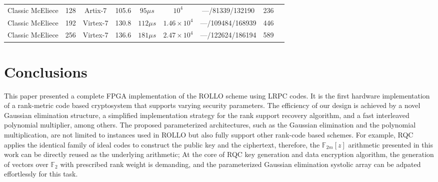 \documentclass[submission]{iacrtrans}
\theoremstyle{plain}
\begin{document}
\begin{table}[t]
\begin{minipage}{1\textwidth}
{\begin{tabular}{lcccccccc}
Classic McEliece\cite{bernstein2020classic} &{128} &{Artix-7} & {105.6}   & $95 \mu s$    & $10^4$  & {---/81339/132190}& {236}\\
Classic McEliece\cite{bernstein2020classic} &{192} &{Virtex-7} & {130.8}   & $112 \mu s$    & $1.46\times 10^4$  & {---/109484/168939}& {446}\\
Classic McEliece\cite{bernstein2020classic} &{256} &{Virtex-7} & {136.6}   & $181 \mu s$    & $2.47\times 10^4$  & {---/122624/186194}& {589}\\
\hline
\end{tabular}}
\end{minipage}
\end{table}

\section{Conclusions}
This paper presented a complete FPGA implementation of the ROLLO scheme using LRPC codes.
It is the first hardware implementation of a rank-metric code based cryptosystem that supports varying security parameters. The efficiency of our design is achieved by a novel Gaussian elimination structure, a simplified implementation strategy for the rank support recovery algorithm, and a fast interleaved polynomial multiplier, among others. The proposed parameterized architectures, such as the Gaussian elimination and the polynomial multiplication, are not limited to instances used in ROLLO but also fully support other rank-code based schemes. For example, RQC applies the identical family of ideal codes to construct the public key and the ciphertext, therefore, the $\mathbb{F}_{2m}[z]$ arithmetic presented in this work can be directly reused as the underlying arithmetic; At the core of RQC key generation and data encryption algorithm, the generation of vectors over $\mathbb{F}_{2}$ with prescribed rank weight is demanding, and the parameterized Gaussian elimination systolic array can be adpated effortlessly for this task.



\end{document}
